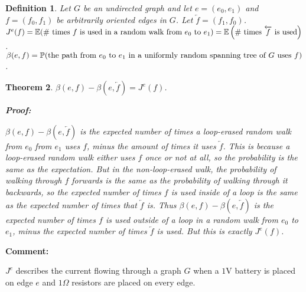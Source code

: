 \documentclass{article}
\theoremstyle{colontheorem}
\newtheorem{theorem}{Theorem}[section]
\newtheorem{definition}[theorem]{Definition}
\newenvironment{Theorem}
{
	\begin{mdframed}[backgroundcolor=TheoremOrange!10]
	\begin{theorem}
}
{
	\end{theorem}
	\end{mdframed}
	
	\vspace{.15in}
}
\newenvironment{Def}
{
	\begin{mdframed}[backgroundcolor=DefGreen!10]
	\begin{definition}
}
{
	\end{definition}
	\end{mdframed}
	
	\vspace{.15in}
}
\newenvironment{Comment}
{
	\begin{mdframed}[backgroundcolor=CommentBlue!10]
	\textbf{Comment:}%
}
{
	\end{mdframed}
	
	\vspace{.15in}
}
\newenvironment{Proof}
{
	\begin{mdframed}[backgroundcolor=ProofPurple!10]
	\textbf{Proof:}%
}
{
	\end{mdframed}
	
	\vspace{.085in}
}
\begin{document}
\begin{Def}
	
	Let $G$ be an undirected graph and let $e = (e_0, e_1)$ and $f = (f_0, f_1)$ be arbitrarily oriented edges in $G$. Let $\overleftarrow{f} = (f_1, f_0)$. $J^e(f) = \mathbb{E}(\textnormal{\# times } f \textnormal{ is used in a random walk from } e_0 \textnormal{ to } e_1) = \mathbb{E} \left( \textnormal{\# times } \overleftarrow{f} \textnormal{ is used} \right)$. $\beta(e, f) = \mathbb{P}(\textnormal{the path from } e_0 \textnormal{ to } e_1 \textnormal{ in a uniformly random spanning tree of } G \textnormal{ uses } f)$.
	
\end{Def}



\begin{Theorem}
	
	$\beta(e, f) - \beta \left( e, \overleftarrow{f} \right) = J^e(f)$.
	
	\begin{Proof}
		$\beta(e, f) - \beta \left( e, \overleftarrow{f} \right)$ is the expected number of times a loop-erased random walk from $e_0$ from $e_1$ uses $f$, minus the amount of times it uses $\overleftarrow{f}$. This is because a loop-erased random walk either uses $f$ once or not at all, so the probability is the same as the expectation. But in the non-loop-erased walk, the probability of walking through $f$ forwards is the same as the probability of walking through it backwards, so the expected number of times $f$ is used inside of a loop is the same as the expected number of times that $\overleftarrow{f}$ is. Thus $\beta(e, f) - \beta \left( e, \overleftarrow{f} \right)$ is the expected number of times $f$ is used outside of a loop in a random walk from $e_0$ to $e_1$, minus the expected number of times $\overleftarrow{f}$ is used. But this is exactly $J^e(f)$.
		
	\end{Proof}
	
\end{Theorem}



\begin{Comment}
	$J^e$ describes the current flowing through a graph $G$ when a $1$V battery is placed on edge $e$ and $1\Omega$ resistors are placed on every edge.
	
\end{Comment}
\end{document}
